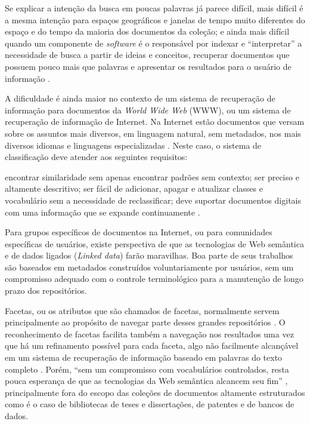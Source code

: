 Se explicar a intenção da busca em poucas palavras já parece difícil, mais difícil é a mesma intenção para espaços geográficos e janelas de tempo muito diferentes do espaço e do tempo da maioria dos documentos da coleção; e ainda mais difícil quando um componente de \textit{software} é o responsável por indexar e ``interpretar'' a necessidade de busca a partir de ideias e conceitos, recuperar documentos que possuem pouco mais que palavras e apresentar os resultados para o usuário de informação \cite{hong06}.

A dificuldade é ainda maior no contexto de um sistema de recuperação de informação para documentos da \textit{World Wide Web} (WWW), ou um sistema de recuperação de informação de Internet. Na Internet estão documentos que versam sobre os assuntos mais diversos, em linguagem natural, sem metadados, nos mais diversos idiomas e linguagens especializadas \cite{hong06}. Neste caso, o sistema de classificação deve atender aos seguintes requisitos: 

\begin{citacao}
encontrar similaridade sem apenas encontrar padrões sem contexto; ser preciso e altamente descritivo; ser fácil de adicionar, apagar e atualizar classes e vocabulário sem a necessidade de reclassificar; deve suportar documentos digitais com uma informação que se expande continuamente \cite[p. 46, tradução nossa]{hong06}.
\end{citacao}

Para grupos específicos de documentos na Internet, ou para comunidades específicas de usuários, existe perspectiva de que as tecnologias de Web semântica e de dados ligados (\textit{Linked data}) farão maravilhas. Boa parte de seus trabalhos são baseados em metadados construídos voluntariamente por usuários, sem um compromisso adequado com o controle terminológico para a manutenção de longo prazo dos repositórios. 

Facetas, ou os atributos que são chamados de facetas, normalmente servem principalmente ao propósito de navegar parte desses grandes repositórios \cite{oren06facetedRDF}. O reconhecimento de facetas facilita também a navegação nos resultados uma vez que há um refinamento possível para cada faceta, algo não facilmente alcançável em um sistema de recuperação de informação baseado em palavras do texto completo \cite{sacco2006,auer09linkedgeodata,docubrowse10,maculan2011,pontesLima2012}. Porém, ``sem um compromisso com vocabulários controlados, resta pouca esperança de que as tecnologias da Web semântica alcancem seu fim'' \cite[p. 269, tradução nossa]{labarre2010}, principalmente fora do escopo das coleções de documentos altamente estruturados como é o caso de bibliotecas de teses e dissertações, de patentes e de bancos de dados.


